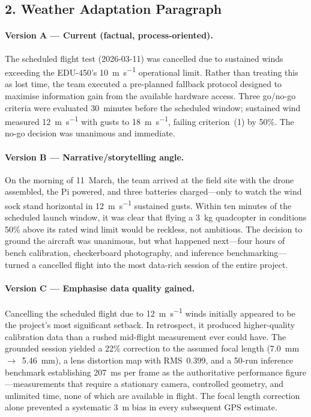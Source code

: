 \subsection*{2. Weather Adaptation Paragraph}

\paragraph{{\color{blue} Version A --- Current (factual, process-oriented).}}
The scheduled flight test (2026-03-11) was cancelled due to sustained winds exceeding the EDU-450's \SI{10}{\metre\per\second} operational limit. Rather than treating this as lost time, the team executed a pre-planned fallback protocol designed to maximise information gain from the available hardware access. Three go/no-go criteria were evaluated 30~minutes before the scheduled window; sustained wind measured \SI{12}{\metre\per\second} with gusts to \SI{18}{\metre\per\second}, failing criterion~(1) by 50\%. The no-go decision was unanimous and immediate.

\paragraph{{\color{red} Version B --- Narrative/storytelling angle.}}
On the morning of 11~March, the team arrived at the field site with the drone assembled, the Pi powered, and three batteries charged---only to watch the wind sock stand horizontal in \SI{12}{\metre\per\second} sustained gusts. Within ten minutes of the scheduled launch window, it was clear that flying a \SI{3}{\kilo\gram} quadcopter in conditions 50\% above its rated wind limit would be reckless, not ambitious. The decision to ground the aircraft was unanimous, but what happened next---four hours of bench calibration, checkerboard photography, and inference benchmarking---turned a cancelled flight into the most data-rich session of the entire project.

\paragraph{{\color{olive} Version C --- Emphasise data quality gained.}}
Cancelling the scheduled flight due to \SI{12}{\metre\per\second} winds initially appeared to be the project's most significant setback. In retrospect, it produced higher-quality calibration data than a rushed mid-flight measurement ever could have. The grounded session yielded a 22\% correction to the assumed focal length (\SI{7.0}{\milli\metre}~$\rightarrow$~\SI{5.46}{\milli\metre}), a lens distortion map with RMS~0.399, and a 50-run inference benchmark establishing \SI{207}{\milli\second} per frame as the authoritative performance figure---measurements that require a stationary camera, controlled geometry, and unlimited time, none of which are available in flight. The focal length correction alone prevented a systematic \SI{3}{\metre} bias in every subsequent GPS estimate.

